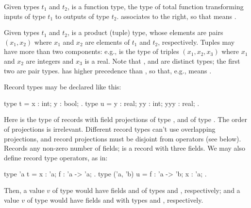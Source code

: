 Given types $t_1$ and $t_2$,  is a function type,
the type of total function transforming inputs of type $t_1$ to
outputs of type $t_2$. \ec{->} associates to the right, so that
 means .

Given types $t_1$ and $t_2$,  is a product (tuple)
type, whose elements are pairs $(x_1, x_2)$ where $x_1$ and $x_2$ are
elements of $t_1$ and $t_2$, respectively. Tuples may have more than
two components: e.g.,  is the type of triples
$(x_1, x_2, x_3)$ where $x_1$ and $x_2$ are integers and $x_3$ is a real.
Note that ,  and
 are distinct types; the first two are pair types.
\ec{*} has higher precedence than \ec{->}, so that, e.g.,
 means .

Record types may be declared like this:
\begin{easycrypt}{}{}
  type t = { x : int; y : bool; }.
  type u = { y : real; yy : int; yyy : real; }.
\end{easycrypt}
Here  is the type of records with field projections  of
type , and  of type . The order of projections is
irrelevant.  Different record types can't use overlapping projections,
and record projections must be disjoint from operators (see
below). Records any non-zero number of fields;  is a record with
three fields. We may also define record type operators, as in:
\begin{easycrypt}{}{}
  type 'a t = { x : 'a; f : 'a -> 'a; }.
  type ('a, 'b) u = { f : 'a -> 'b; x : 'a; }.
\end{easycrypt}
Then, a value $v$ of type  would have fields  and
 of types  and , respectively; and
a value $v$ of type  would have fields  and
 with types  and , respectively.

